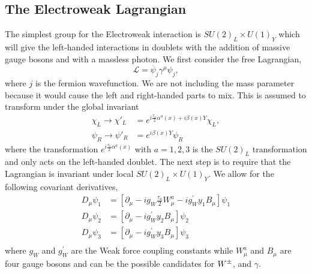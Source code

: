 \subsection{The Electroweak Lagrangian}

The simplest group for the Electroweak interaction is $SU(2)_L\times U(1)_Y$ which will give the left-handed interactions in doublets with the addition of massive gauge bosons \W{} and \Z{} with a massless photon. We first consider the free Lagrangian,
\begin{equation}\label{WeakL}
\mathcal{L}=\overline{\psi}_j\gamma^\mu\psi_j,
\end{equation}
where $j$ is the fermion wavefunction. We are not including the mass parameter because it would cause the left and right-handed parts to mix.  This is assumed to transform under the global invariant
\begin{equation}\label{WeakGlobal}
\begin{split}
\chi_L\rightarrow\chi'_L&=e^{i\frac{\tau_a}{2}\alpha^a(x)+i\beta(x)Y}\chi_L, \\
\psi_R\rightarrow\psi'_R&=e^{i\beta(x)Y}\psi_R
\end{split}
\end{equation}
where the transformation $e^{i\frac{\tau_a}{2}\alpha^a(x)}$ with $a = 1, 2, 3$ is the $SU(2)_L$ transformation and only acts on the left-handed doublet. The next step is to require that the Lagrangian is invariant under local $SU(2)_L\times U(1)_Y$. We allow for the following covariant derivatives,
\begin{equation}
\begin{split}
D_\mu\psi_1&=[\partial_\mu-ig_W\frac{\tau_a}{2}W_\mu^a-ig_W^\prime y_1 B_\mu]\psi_1 \\
D_\mu\psi_2&=[\partial_\mu-ig_W^\prime y_2 B_\mu]\psi_2 \\
D_\mu\psi_3&=[\partial_\mu-ig_W^\prime y_3 B_\mu]\psi_3 \\
\end{split}
\end{equation}
where $g_W$ and $g_W^{\prime}$ are the Weak force coupling constants while $W_\mu^a$ and $B_\mu$ are four gauge bosons and can be the possible candidates for $W^\pm$, \Z and $\gamma$. 

